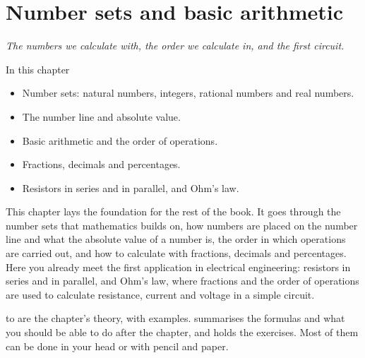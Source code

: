 
\chapter{Number sets and basic arithmetic}
\label{c1:ch}

{\large\itshape The numbers we calculate with, the order we calculate in, and the first
circuit.\par}

\begin{chapterbox}{In this chapter}
\begin{itemize}
  \item Number sets: natural numbers, integers, rational numbers and real numbers.
  \item The number line and absolute value.
  \item Basic arithmetic and the order of operations.
  \item Fractions, decimals and percentages.
  \item Resistors in series and in parallel, and Ohm's law.
\end{itemize}
\end{chapterbox}

This chapter lays the foundation for the rest of the book. It goes through the number sets that
mathematics builds on, how numbers are placed on the number line and what the absolute value of a
number is, the order in which operations are carried out, and how to calculate with fractions,
decimals and percentages. Here you already meet the first application in electrical engineering:
resistors in series and in parallel, and Ohm's law, where fractions and the order of operations are
used to calculate resistance, current and voltage in a simple circuit.

 to  are the chapter's theory, with examples.
 summarises the formulas and what you should be able to do after the
chapter, and  holds the exercises. Most of them can be done in your head
or with pencil and paper.




